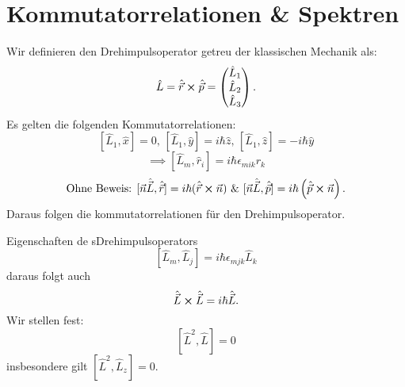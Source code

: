 \documentclass{report}
\begin{document}
\section{Kommutatorrelationen \& Spektren}
Wir definieren den Drehimpulsoperator getreu der klassischen Mechanik als: \[
	\hat{L} = \hat{\vec{r}} \cross \hat{\vec{p}} = \begin{pmatrix} \hat{L}_1 \\ \hat{L}_2 \\ \hat{L}_3 \end{pmatrix} 
.\] Es gelten die folgenden Kommutatorrelationen: \[
[\hat{L}_1, \hat{x}] = 0 \text{, } [\hat{L}_1, \hat{y}] = i\hbar \hat{z} \text{, } [\hat{L}_1, \hat{z}] = -i\hbar \hat{y}
\] \[
\implies [\hat{L}_m, \hat{r}_i] = i \hbar \epsilon_{mik} r_k
\] \[
\text{Ohne Beweis: } [\vec{n}\hat{\vec{L}}, \hat{\vec{r}}] = i\hbar(\hat{\vec{r}} \cross \vec{n}) \text{ \& } [ \vec{n} \hat{\vec{L}}, \hat{\vec{p}}] = i\hbar\left( \hat{\vec{p}} \cross \vec{n} \right) 
.\] Daraus folgen die kommutatorrelationen für den Drehimpulsoperator.
\begin{redbox}{Eigenschaften de sDrehimpulsoperators}
	\[
		[\hat{L}_m, \hat{L}_j] = i\hbar \epsilon_{mjk} \hat{L}_k
	\] daraus folgt auch \[
	\hat{\vec{L}} \cross \hat{\vec{L}} = i \hbar \hat{\vec{L}}
	.\] Wir stellen fest: \[
	[\hat{L}^2, \hat{L}] = 0
\] insbesondere gilt $[\hat{L}^2, \hat{L}_z] = 0$.  		 
\end{redbox}
\end{document}
